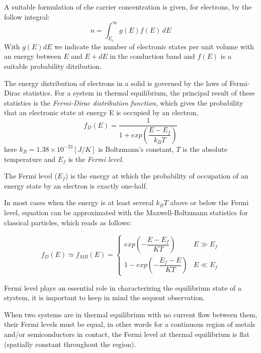 A suitable formulation of che carrier concentration is given, for electrons, by the follow integral:
\begin{equation}
\label{eq: carrier densiy integral}
n = \int_{E_c}^\infty g(E)f(E) \, dE
\end{equation}
With $g(E)dE$ we indicate the number of electronic states per unit volume with an energy between $E$ and $E+dE$ in the conduction band and $f(E)$ is a suitable probability ditribution.

The energy distribution of electrons in a solid is governed by the laws of Fermi-Dirac statistics. For a system in thermal equilibrium, the principal result of these statistics is the \textit{Fermi-Dirac distribution function}, which gives the probability that an electronic state at energy E is occupied by an electron,
\begin{equation}
\label{eq: fermi dirac distribution}
f_D(E) = \dfrac{1}{1+exp\left(\dfrac{E-E_f}{k_BT}\right)} 
\end{equation}
here $k_B=1.38\times10^{-23}[J/K]$ is Boltzmann's constant, $T$ is the absolute temperature and $E_f$ is the \textit{Fermi level}.

\begin{Definizione}
The Fermi level ($E_f$) is the energy at which the probability of occupation of an energy state by an electron is exactly one-half.
\end{Definizione}

In most cases when the energy is at least several $k_BT$ above or below the Fermi level, equation  can be approximated with the Maxwell-Boltzmann statistics for classical particles, which reads as follows:

\begin{equation}
\label{eq: maxwell distribution}
f_D(E)\simeq f_{MB}(E) = 
\begin{cases}
exp\left(-\dfrac{E-E_f}{KT}\right) & E\gg E_f \\
1-exp\left(-\dfrac{E_f-E}{KT}\right) & E \ll E_f
\end{cases}
\end{equation}

Fermi level plays an essential role in characterizing the equilibrium state of a stystem, it is important to keep in mind the sequent observation.

\begin{Osservazione}
When two systems are in thermal equilibrium with no current flow between them, their Fermi levels must be equal, in other words for a continuous region of metals and/or semiconductors in contact, the Fermi level at thermal equilibrium is flat (spatially constant throughout the region).
\end{Osservazione}

